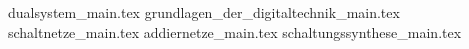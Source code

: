 
{dualsystem_main.tex}
{grundlagen_der_digitaltechnik_main.tex}
{schaltnetze_main.tex}
{addiernetze_main.tex}
{schaltungssynthese_main.tex}